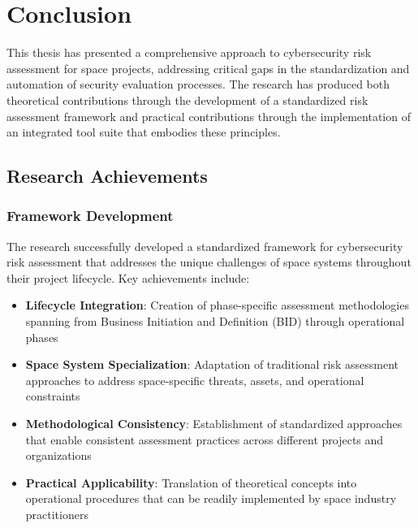 \documentclass[binding=0.6cm]{sapthesis}
\begin{document}
\chapter{Conclusion}
\label{ch:conclusion}

This thesis has presented a comprehensive approach to cybersecurity risk assessment for space projects, addressing critical gaps in the standardization and automation of security evaluation processes. The research has produced both theoretical contributions through the development of a standardized risk assessment framework and practical contributions through the implementation of an integrated tool suite that embodies these principles.

\section{Research Achievements}

\subsection{Framework Development}

The research successfully developed a standardized framework for cybersecurity risk assessment that addresses the unique challenges of space systems throughout their project lifecycle. Key achievements include:

\begin{itemize}
    \item \textbf{Lifecycle Integration}: Creation of phase-specific assessment methodologies spanning from Business Initiation and Definition (BID) through operational phases
    \item \textbf{Space System Specialization}: Adaptation of traditional risk assessment approaches to address space-specific threats, assets, and operational constraints
    \item \textbf{Methodological Consistency}: Establishment of standardized approaches that enable consistent assessment practices across different projects and organizations
    \item \textbf{Practical Applicability}: Translation of theoretical concepts into operational procedures that can be readily implemented by space industry practitioners
\end{itemize}
\end{document}
